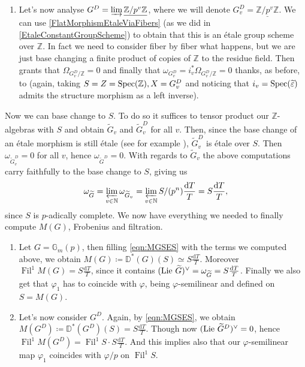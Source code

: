 \begin{ex}[]
\begin{enumerate}
	\item Let's now analyse $G^D = \varinjlim \underline{\mathbb{Z}/p^v\mathbb{Z}}$, where
		we will denote $G_v^D = \underline{\mathbb{Z}/p^v\mathbb{Z}}$.
		We can use \cref{FlatMorphismEtaleViaFibers} (as we did in
		\cref{EtaleConstantGroupScheme}) to obtain that this is an étale
		group scheme over $\mathbb{Z}$.
		In fact we need to consider fiber by fiber what happens, but we are
		just base changing a finite product of copies of $\mathbb{Z}$ to the
		residue field.
		Then \cite[\href{https://stacks.math.columbia.edu/tag/00U0}{Section 00U0}]{SP}
		grants that $\Omega_{G_v^D/\mathbb{Z}} = 0$
		and finally that $\omega_{G_v^D} = i^*_v \Omega_{G^D_v/\mathbb{Z}} = 0$ thanks,
		as before, to
		\cite[\href{https://stacks.math.columbia.edu/tag/0474}{Lemma 0474}]{SP}
		(again, taking $S = Z = \operatorname{Spec}(\mathbb{Z}), X = G_v^D$
		and noticing that $i_v = \operatorname{Spec}(\widetilde{\varepsilon})$ admits the structure morphism
		as a left inverse).
\end{enumerate}
	Now we can base change to $S$.
	To do so it suffices to tensor product our $\mathbb{Z}$-algebras
	with $S$ and obtain $\widetilde{G}_v$ and $\widetilde{G}_v^D$ for all $v$.
	Then, since the base change of an étale morphism is still étale (see for example
	\cite[\href{https://stacks.math.columbia.edu/tag/02GO}{Lemma 02GO}]{SP}),
	$\widetilde{G}_v^D$ is étale over $S$.
	Then $\omega_{\widetilde{G}_v^D} = 0$ for all $v$,
	hence $\omega_{\widetilde{G}^D} = 0$.
	With regards to $\widetilde{G}_v$ the above computations carry faithfully
	to the base change to $S$, giving us
	\begin{equation*}
	\omega_{\widetilde{G}} = \varprojlim_{v \in \mathbb{N}} \omega_{\widetilde{G}_v} =
	\varprojlim_{v \in \mathbb{N}} S/ (p^n) \frac{ \mathrm{d}T }{ T } = S \frac{ \mathrm{d}T }{ T }
	,\end{equation*}
	since $S$ is $p$-adically complete.
	We now have everything we needed to finally compute $M(G)$, Frobenius and filtration.
\begin{enumerate}
	\item Let $G = \mathbb{G}_m(p)$, then filling \cref{eqn:MGSES} with
		the terms we computed above, we obtain
		$M(G) \coloneqq \mathbb{D}^*(G)(S) \simeq S\frac{ \mathrm{d}T }{ T }$.
		Moreover $\operatorname{Fil}^1 M(G) = S\frac{ \mathrm{d}T }{ T }$, since it contains
		$(\operatorname{Lie}\, \widetilde{G})^\vee = \omega_{\widetilde{G}} = S\frac{ \mathrm{d}T }{ T }$.
		Finally we also get that $\varphi_1$ has to coincide with $\varphi$,
		being $\varphi$-semilinear and defined on $S = M(G)$.

	\item Let's now consider $G^D$.
		Again, by \cref{eqn:MGSES}, we obtain
		$M(G^D) \coloneqq \mathbb{D}^*(G^D)(S) = S\frac{ \mathrm{d}T }{ T }$.
		Though now $(\operatorname{Lie}\, \widetilde{G}^D)^\vee = 0$,
		hence $\operatorname{Fil}^1 M(G^D) = \operatorname{Fil}^1 S \cdot S\frac{ \mathrm{d}T }{ T }$.
		And this implies also that our $\varphi$-semilinear map
		$\varphi_1$ coincides with $\varphi/p$ on $\operatorname{Fil}^1S$.
\end{enumerate}
\end{ex}
